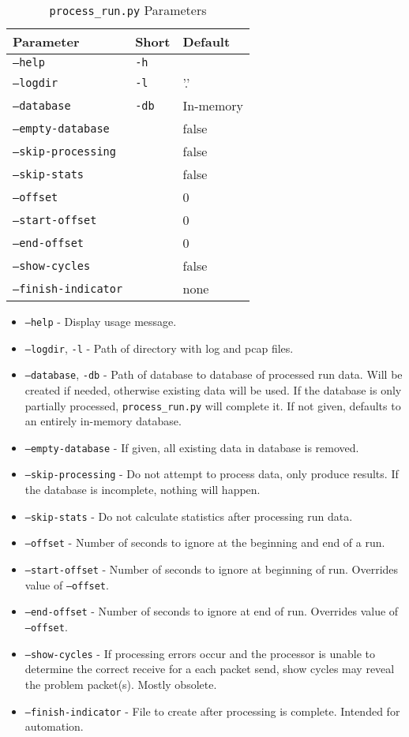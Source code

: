 \begin{table}
\caption{\texttt{process\_run.py} Parameters}
\label{tbl:process_run_param}
\centering
\begin{tabular}{l|l|l}
Parameter & Short & Default\\
\hline
\texttt{--help} & \texttt{-h} & \\
\texttt{--logdir} & \texttt{-l} & '.' \\
\texttt{--database} & \texttt{-db} & In-memory\\
\texttt{--empty-database} & & false\\
\texttt{--skip-processing} & & false\\
\texttt{--skip-stats} & & false\\
\texttt{--offset} & & 0\\
\texttt{--start-offset} & & 0\\
\texttt{--end-offset} & & 0\\
\texttt{--show-cycles} & & false\\
\texttt{--finish-indicator} & & none
\end{tabular}
\end{table}

\begin{itemize}
\item \texttt{--help} - Display usage message.
\item \texttt{--logdir}, \texttt{-l} - Path of directory with log and pcap files.
\item \texttt{--database}, \texttt{-db} - Path of database to database of processed run data. Will be created if needed, otherwise existing data will be used. If the database is only partially processed, \texttt{process\_run.py} will complete it. If not given, defaults to an entirely in-memory database.
\item \texttt{--empty-database} - If given, all existing data in database is removed.
\item \texttt{--skip-processing} - Do not attempt to process data, only produce results. If the database is incomplete, nothing will happen.
\item \texttt{--skip-stats} - Do not calculate statistics after processing run data.
\item \texttt{--offset} - Number of seconds to ignore at the beginning and end of a run.
\item \texttt{--start-offset} - Number of seconds to ignore at beginning of run. Overrides value of \texttt{--offset}.
\item \texttt{--end-offset} - Number of seconds to ignore at end of run. Overrides value of \texttt{--offset}.
\item \texttt{--show-cycles} - If processing errors occur and the processor is unable to determine the correct receive for a each packet send, show cycles may reveal the problem packet(s). Mostly obsolete.
\item \texttt{--finish-indicator} - File to create after processing is complete. Intended for automation.
\end{itemize}

